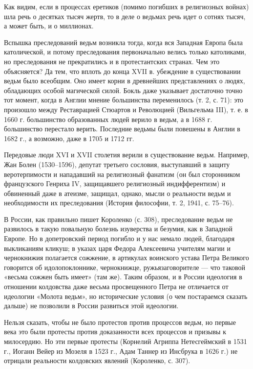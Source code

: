 Как видим,  если в процессах  еретиков (помимо погибших  в религиозных
войнах) шла речь о десятках тысяч жертв, то в деле о ведьмах речь идет
о сотнях тысяч, а может быть, и о миллионах.

Вспышка преследований ведьм возникла  тогда, когда вся Западная Европа
была католической, и потому  преследования первоначально велись только
католиками,  но  преследования  не  прекратились  и  в  протестантских
странах. Чем  это объясняется?  Да тем,  что вплоть  до конца  XVII в.
убеждение  в существовании  ведьм  было всеобщим.  Оно  имеет корни  в
древнейших представлениях о людях, обладающих особой магической силой.
Бокль  даже указывает  достаточно  точно тот  момент,  когда в  Англии
мнение большинства  переменилось (т.  2, с.  71): это  произошло между
Реставрацией Стюартов и  Революцией (Вильгельма III), т. е.  в 1660 г.
большинство образованных людей верило в ведьм, а в 1688 г. большинство
перестало верить. Последние ведьмы были повешены в Англии в 1682 г., а
возможно, даже в 1705 и 1712 гг.

Передовые  люди XVI  и  XVII столетия  верили  в существование  ведьм.
Например,   Жан  Болен   (1530--1596),   депутат  третьего   сословия,
выступавший  в  защиту  веротерпимости  и  нападавший  на  религиозный
фанатизм  (он был  сторонником  французского  Генриха IV,  защищавшего
религиозный  индифферентизм) и  обвиненный  даже  в атеизме,  защищал,
однако,  мысли о  реальности  ведьм и  необходимости их  преследования
(История философии, т. 2, 1941, с. 75--76).

В России, как правильно пишет  Короленко (с. 308), преследование ведьм
не развилось  в такую  повальную болезнь изуверства  и безумия,  как в
Западной  Европе. Но  в допетровский  период  погибло и  у нас  немало
людей, благодаря выкликаниям кликуш;  в указах царя Федора Алексеевича
учителям  магии   и  чернокнижия  полагается  сожжение,   в  артикулах
воинского   устава  Петра   Великого  говорится   об  идолопоклоннике,
чернокнижце,  ружьязаговорителе ---  что таковой  «весьма сожжен  быть
имеет»  (там же).  Таким образом,  и  в России  идеология в  отношении
колдовства даже весьма просвещенного  Петра не отличается от идеологии
«Молота  ведьм», но  исторические условия  (о чем  постараемся сказать
дальше) не позволили в России развиться этой идеологии.

Нельзя сказать,  чтобы не  было протестов  против процессов  ведьм, но
первые века  это были  протесты против  доказанности всех  процессов и
призывы  к  милосердию.  Но  эти  первые  протесты  (Корнелий  Агриппа
Нетесгеймский в 1531 г., Иоганн Вейер из Мозеля в 1523 г., Адам Таннер
из  Инсбрука в  1626  г.) не  отрицали  реальности колдовских  явлений
(Короленко, с. 307).

